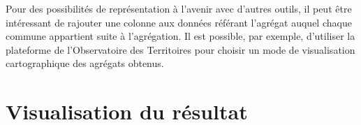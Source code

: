 \documentclass[
]{article}
\newenvironment{Shaded}{\begin{snugshade}}{\end{snugshade}}
\newcommand{\CommentTok}[1]{\textcolor[rgb]{0.56,0.35,0.01}{\textit{#1}}}
\newcommand{\NormalTok}[1]{#1}
\newcommand{\OtherTok}[1]{\textcolor[rgb]{0.56,0.35,0.01}{#1}}
\newcommand{\SpecialCharTok}[1]{\textcolor[rgb]{0.00,0.00,0.00}{#1}}
\begin{document}
Pour des possibilités de représentation à l'avenir avec d'autres outils,
il peut être intéressant de rajouter une colonne aux données référant
l'agrégat auquel chaque commune appartient suite à l'agrégation. Il est
possible, par exemple, d'utiliser la plateforme de l'Observatoire des
Territoires pour choisir un mode de visualisation cartographique des
agrégats obtenus.

\begin{Shaded}
\end{Shaded}

\hypertarget{visualisation-du-ruxe9sultat}{%
\section{Visualisation du résultat}\label{visualisation-du-ruxe9sultat}}
\end{document}
